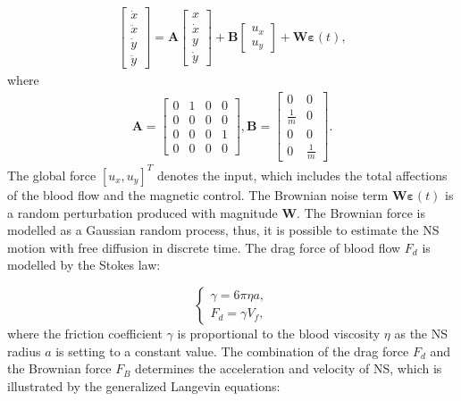 \documentclass[conference]{IEEEtran}
\begin{document}
\begin{equation}
\label{eq0_1}
\begin{aligned}
  \begin{bmatrix}
	\dot{x}\\
	\ddot{x}\\
	\dot{y}\\
	\ddot{y}
  \end{bmatrix} =
  \textbf{A} \begin{bmatrix} x\\ \dot{x}\\ y\\ \dot{y} \end{bmatrix} +
 \textbf{B} \begin{bmatrix} u_x \\ u_y \end {bmatrix} + \textbf{W}  \boldsymbol{ \varepsilon } (t),
\end {aligned}
\end{equation}
where
\begin{equation}
\label{eq0_2}
\begin{aligned}
	\textbf{A} =  \begin{bmatrix}
		0&1&0&0\\
		0&0&0&0\\
		0&0&0&1\\
		0&0&0&0
	  \end{bmatrix},
	\textbf{B} =  \begin{bmatrix}
		 0&0 \\
	      {\frac{1}{m}}&0 \\
		 0&0 \\
		 0&{\frac{1}{m}}
	     \end{bmatrix}.
\end {aligned}
\end{equation}
The global force $\left[ u_x,u_y \right]^{T} $ denotes the input, which includes the total affections of the blood flow and the magnetic control. The Brownian noise term $ \textbf{W} \boldsymbol{\varepsilon} (t) $ is a random perturbation produced with magnitude $\textbf{W}$. The Brownian force is modelled as a Gaussian random process, thus, it is possible to estimate the NS motion with free diffusion in discrete time. The drag force of blood flow $F_d$ is modelled by the Stokes law:


\begin{equation}
\label{eq2}
\left\{
\begin{aligned}
  \gamma=6 \pi \eta a, \\
  F_d={\gamma V_f},
\end {aligned}
\right.
\end{equation}
where the friction coefficient $\gamma$ is proportional to the blood viscosity $\eta$ as the NS radius $a$ is setting to a constant value. The combination of the drag force $F_d$ and the Brownian force $F_B$ determines the acceleration and velocity of NS, which is illustrated by the generalized Langevin equations:
\end{document}

